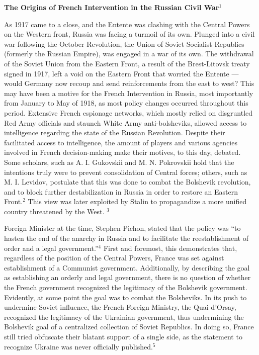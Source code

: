 



\begin{center}

  \textbf{The Origins of French Intervention in the Russian Civil War}$^1$

\end{center}

\begin{justify}

  \hspace{.5in} As 1917 came to a close, and the Entente was clashing with the Central Powers on the Western front, Russia was facing a turmoil of its own. Plunged into a civil war following the October Revolution, the Union of Soviet Socialist Republics (formerly the Russian Empire), was engaged in a war of its own. The withdrawal of the Soviet Union from the Eastern Front, a result of the Brest-Litovsk treaty signed in 1917, left a void on the Eastern Front that worried the Entente — would Germany now recoup and send reinforcements from the east to west? This may have been a motive for the French Intervention in Russia, most importantly from January to May of 1918, as most policy changes occurred throughout this period. Extensive French espionage networks, which mostly relied on disgruntled Red Army officials and staunch White Army anti-bolsheviks, allowed access to intelligence regarding the state of the Russian Revolution. Despite their facilitated access to intelligence, the amount of players and various agencies involved in French decision-making make their motives, to this day, debated. Some scholars, such as A. I. Gukovskii and M. N. Pokrovskii hold that the intentions truly were to prevent consolidation of Central forces; others, such as M. I. Levidov, postulate that this was done to combat the Bolshevik revolution, and to block further destabilization in Russia in order to restore an Eastern Front.$^{2}$ This view was later exploited by Stalin to propagandize a more unified country threatened by the West. $^{3}$

  \hspace{.5in} Foreign Minister at the time, Stephen Pichon, stated that the policy was ``to hasten the end of the anarchy in Russia and to facilitate the reestablishment of order and a legal government.''$^{4}$ First and foremost, this demonstrates that, regardless of the position of the Central Powers, France was set against establishment of a Communist government. Additionally, by describing the goal as establishing an orderly and legal government, there is no question of whether the French government recognized the legitimacy of the Bolshevik government. Evidently, at some point the goal was to combat the Bolsheviks. In its push to undermine Soviet influence, the French Foreign Ministry, the Quai d'Orsay, recognized the legitimacy of the Ukrainian government, thus undermining the Bolshevik goal of a centralized collection of Soviet Republics. In doing so, France still tried obfuscate their blatant support of a single side, as the statement to recognize Ukraine was never officially published.$^{5}$


\end{justify}
